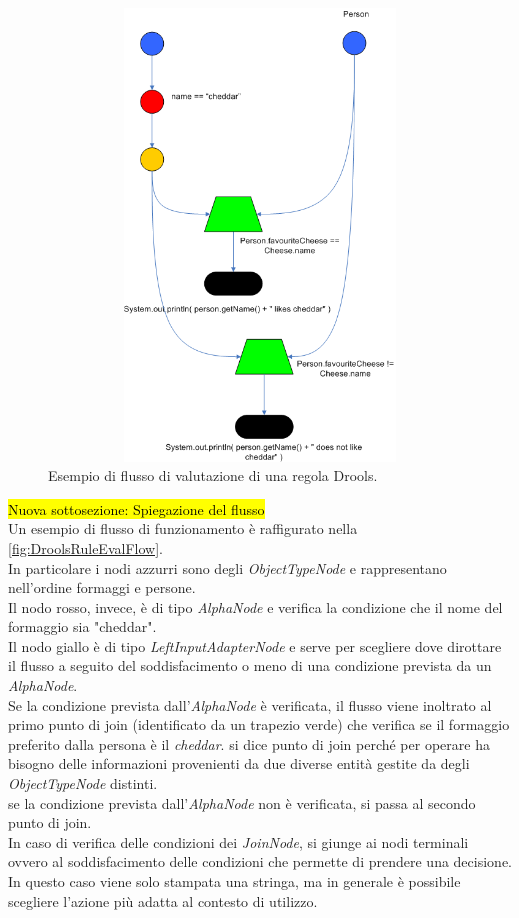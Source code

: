  	
 	\begin{figure}[H]
 		\begin{center}
 			\includegraphics[width=12cm,height=12cm,keepaspectratio]{Pics/drools_rule_flow_example.png}
 			\caption{Esempio di flusso di valutazione di una regola Drools.}
 			\label{fig:DroolsRuleEvalFlow}
 		\end{center}
 	\end{figure}
 	
 	\hl{Nuova sottosezione: Spiegazione del flusso} \\
 	Un esempio di flusso di funzionamento è raffigurato nella \autoref{fig:DroolsRuleEvalFlow}. \\
 	In particolare i nodi azzurri sono degli \textit{ObjectTypeNode} e rappresentano nell'ordine formaggi e persone. \\
 	Il nodo rosso, invece, è di tipo \textit{AlphaNode} e verifica la condizione che il nome del formaggio sia "cheddar". \\
 	Il nodo giallo è di tipo \textit{LeftInputAdapterNode} e serve per scegliere dove dirottare il flusso a seguito del soddisfacimento o meno di una condizione prevista da un \textit{AlphaNode}.\\
 	Se la condizione prevista dall'\textit{AlphaNode} è verificata, il flusso viene inoltrato al primo punto di join (identificato da un trapezio verde) che verifica se il formaggio preferito dalla persona è il \textit{cheddar}. si dice punto di join perché per operare ha bisogno delle informazioni provenienti da due diverse entità gestite da degli \textit{ObjectTypeNode} distinti. \\ se la condizione prevista dall'\textit{AlphaNode} non è verificata, si passa al secondo punto di join.\\
 	In caso di verifica delle condizioni dei \textit{JoinNode}, si giunge ai nodi terminali ovvero al soddisfacimento delle condizioni che permette di prendere una decisione. In questo caso viene solo stampata una stringa, ma in generale è possibile scegliere l'azione più adatta al contesto di utilizzo.
 	
